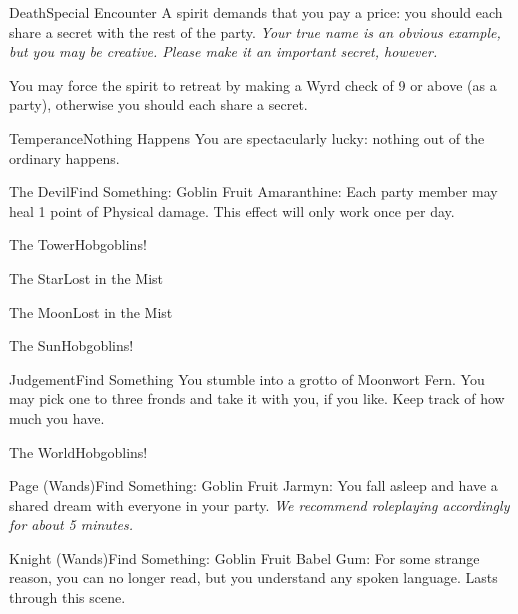 \documentclass[white]{gl2018}
\begin{document}
\begin{location}{Death}{Special Encounter}
A spirit demands that you pay a price: you should each share a secret with the rest of the party.  {\em Your true name is an obvious example, but you may be creative.  Please make it an important secret, however.}

You may force the spirit to retreat by making a Wyrd check of 9 or above (as a party), otherwise you should each share a secret.
\end{location}
\begin{location}{Temperance}{Nothing Happens}
You are spectacularly lucky: nothing out of the ordinary happens.
\end{location}
\begin{location}{The Devil}{Find Something: Goblin Fruit}
Amaranthine: Each party member may heal 1 point of Physical damage.  This effect will only work once per day.
\end{location}
\begin{location}{The Tower}{Hobgoblins!}
\end{location}
\begin{location}{The Star}{Lost in the Mist}
\end{location}
\begin{location}{The Moon}{Lost in the Mist}
\end{location}
\begin{location}{The Sun}{Hobgoblins!}
\end{location}
\begin{location}{Judgement}{Find Something}
You stumble into a grotto of Moonwort Fern.  You may pick one to three fronds and take it with you, if you like.  Keep track of how much you have.
\end{location}
\begin{location}{The World}{Hobgoblins!}
\end{location}
\begin{location}{Page (Wands)}{Find Something: Goblin Fruit}
Jarmyn: You fall asleep and have a shared dream with everyone in your party. \emph{We recommend roleplaying accordingly for about 5 minutes.}
\end{location}
\begin{location}{Knight (Wands)}{Find Something: Goblin Fruit}
Babel Gum:  For some strange reason, you can no longer read, but you understand any spoken language.  Lasts through this scene.
\end{location}
\end{document}
